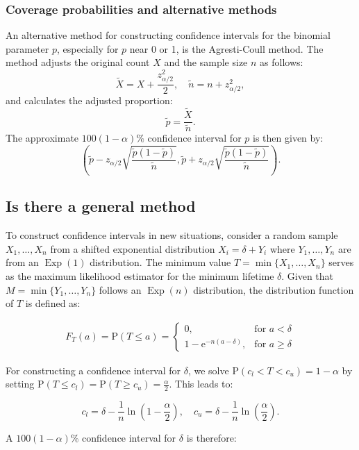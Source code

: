 \documentclass{article}
\begin{document}
\subsubsection*{Coverage probabilities and alternative methods}
An alternative method for constructing confidence intervals for the binomial parameter $p$, especially for $p$ near 0 or 1, is the Agresti-Coull method. The method adjusts the original count $X$ and the sample size $n$ as follows:
\[
\tilde{X} = X + \frac{z_{\alpha/2}^2}{2}, \quad \tilde{n} = n + z_{\alpha/2}^2,
\]
and calculates the adjusted proportion:
\[
\tilde{p} = \frac{\tilde{X}}{\tilde{n}}.
\]
The approximate $100(1-\alpha)\%$ confidence interval for $p$ is then given by:
\[
\left(\tilde{p} - z_{\alpha / 2} \sqrt{\frac{\tilde{p}(1-\tilde{p})}{\tilde{n}}}, \tilde{p} + z_{\alpha / 2} \sqrt{\frac{\tilde{p}(1-\tilde{p})}{\tilde{n}}}\right).
\]

\subsection{Is there a general method}

To construct confidence intervals in new situations, consider a random sample $X_{1}, \ldots, X_{n}$ from a shifted exponential distribution $X_{i} = \delta + Y_{i}$ where $Y_{1}, \ldots, Y_{n}$ are from an $\operatorname{Exp}(1)$ distribution. The minimum value $T = \min \{X_{1}, \ldots, X_{n}\}$ serves as the maximum likelihood estimator for the minimum lifetime $\delta$. Given that $M = \min \{Y_{1}, \ldots, Y_{n}\}$ follows an $\operatorname{Exp}(n)$ distribution, the distribution function of $T$ is defined as:

\begin{align*}
F_{T}(a) = \mathrm{P}(T \leq a) = \begin{cases}
0, & \text{for } a < \delta \\
1 - \mathrm{e}^{-n(a-\delta)}, & \text{for } a \geq \delta
\end{cases}
\end{align*}

For constructing a confidence interval for $\delta$, we solve $\mathrm{P}(c_{l} < T < c_{u}) = 1 - \alpha$ by setting $\mathrm{P}(T \leq c_{l}) = \mathrm{P}(T \geq c_{u}) = \frac{\alpha}{2}$. This leads to:

\[
c_{l} = \delta - \frac{1}{n} \ln \left(1-\frac{\alpha}{2}\right), \quad c_{u} = \delta - \frac{1}{n} \ln \left(\frac{\alpha}{2}\right).
\]

A $100(1-\alpha)\%$ confidence interval for $\delta$ is therefore:
\end{document}
